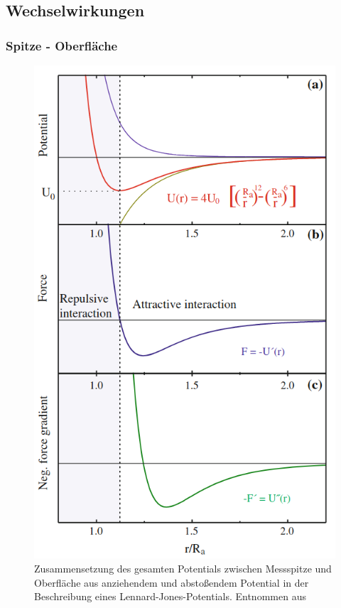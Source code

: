         \FloatBarrier


      \subsection{Wechselwirkungen}

        \subsubsection{Spitze - Oberfläche}

          \FloatBarrier

          \begin{figure}
            \includegraphics[scale = 0.42]{pictures/LJ.png}
            \caption{Zusammensetzung des gesamten Potentials zwischen Messspitze und Oberfläche aus anziehendem und abstoßendem Potential in der Beschreibung eines Lennard-Jones-Potentials. Entnommen aus \cite{voigtlander_scanning_2015}}
            \label{fig:LJ}
          \end{figure}
          \FloatBarrier

